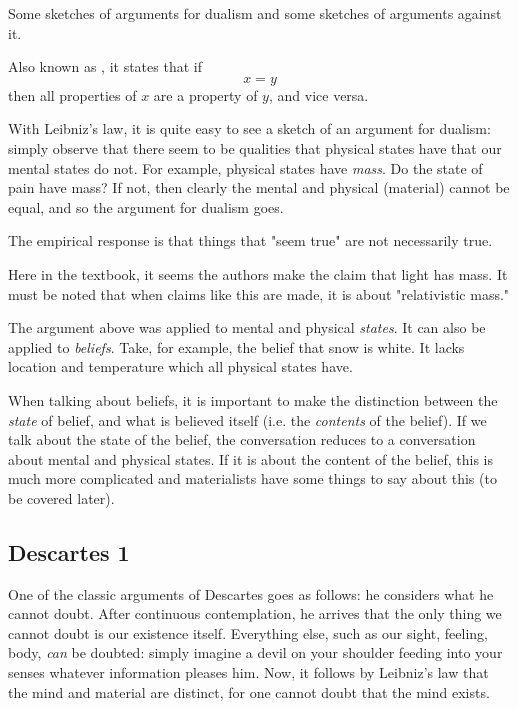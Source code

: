 Some sketches of arguments for dualism and some sketches of arguments against it.

\begin{definition}
    Also known as , it states that if $$x = y$$ then all properties of $x$ are a property of $y$, and vice versa.
\end{definition}

With Leibniz's law, it is quite easy to see a sketch of an argument for dualism: simply observe that there seem to be qualities that physical states have that our mental states do not. For example, physical states have \textit{mass}. Do the state of pain have mass? If not, then clearly the mental and physical (material) cannot be equal, and so the argument for dualism goes.

The empirical response is that things that "seem true" are not necessarily true.
\begin{remark}
    Here in the textbook, it seems the authors make the claim that light has mass. It must be noted that when claims like this are made, it is about "relativistic mass."
\end{remark}

The argument above was applied to mental and physical \textit{states}. It can also be applied to \textit{beliefs}. Take, for example, the belief that snow is white. It lacks location and temperature which all physical states have.

When talking about beliefs, it is important to make the distinction  between the \textit{state} of belief, and what is believed itself (i.e. the \textit{contents} of the belief). If we talk about the state of the belief, the conversation reduces to a conversation about mental and physical states. If it is about the content of the belief, this is much more complicated and materialists have some things to say about this (to be covered later).

\subsection{Descartes 1}

One of the classic arguments of Descartes goes as follows: he considers what he cannot doubt. After continuous contemplation, he arrives that the only thing we cannot doubt is our existence itself. Everything else, such as our sight, feeling, body, \textit{can} be doubted: simply imagine a devil on your shoulder feeding into your senses whatever information pleases him. Now, it follows by Leibniz's law that the mind and material are distinct, for one cannot doubt that the mind exists.

